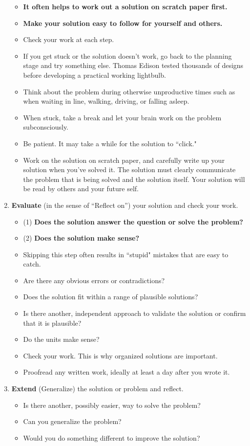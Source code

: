 \begin{enumerate}
\begin{itemize}
    \item {\bf It often helps to work out a solution on scratch paper first.}
    \item {\bf Make your solution easy to follow for yourself and others.}
    \item Check your work at each step.
    \item If you get stuck or the solution doesn't work, go back to the planning stage and try something else. Thomas Edison tested thousands of designs before developing a practical working lightbulb.
    \item Think about the problem during otherwise unproductive times such as when waiting in line, walking, driving, or falling asleep.
    \item When stuck, take a break and let your brain work on the problem subconsciously.
    \item Be patient. It may take a while for the solution to ``click."
    \item Work on the solution on scratch paper, and carefully write up your solution when you've solved it. The solution must clearly communicate the problem that is being solved and the solution itself. Your solution will be read by others and your future self.
\end{itemize}
\item {\bf Evaluate} (in the sense of ``Reflect on'') your solution and check your work.
\begin{itemize}
    \item (1) {\bf Does the solution answer the question or solve the problem?}
    \item (2) {\bf Does the solution make sense?}
    \item Skipping this step often results in ``stupid" mistakes that are easy to catch.
    \item Are there any obvious errors or contradictions?
    \item Does the solution fit within a range of plausible solutions?
    \item Is there another, independent approach to validate the solution or confirm that it is plausible?
    \item Do the units make sense?
    \item Check your work. This is why organized solutions are important.
    \item Proofread any written work, ideally at least a day after you wrote it.
\end{itemize}
\item {\bf Extend} (Generalize) the solution or problem and reflect.
\begin{itemize}
    \item Is there another, possibly easier, way to solve the problem?
    \item Can you generalize the problem?
    \item Would you do something different to improve the solution?
\end{itemize}
\end{enumerate}

